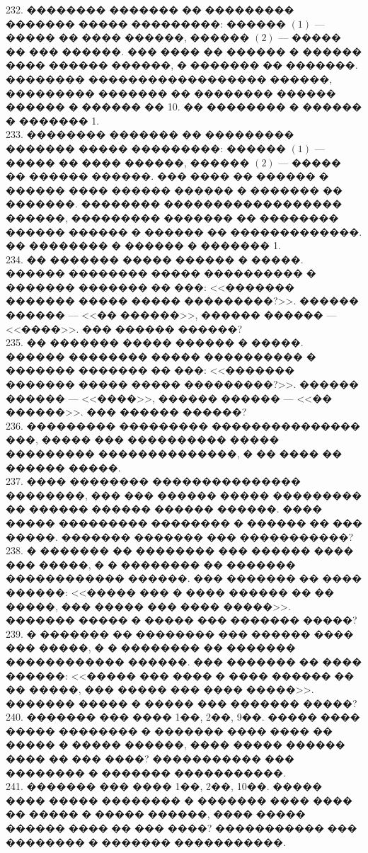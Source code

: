\documentclass[12pt]{article}
\begin{document}
232. �������� ������� �� ��������� ������� ����� ���������: ������ $(1)$ --- ����� �� ���� ������, ������ $(2)$ --- ����� �� ��� ������. ��� ���� �� ������ � ������ ���� ������ ������,  � ������� �� �������. �������� ������������������ ������, ��������� ������� �� �������� ������ ������ � ������ �� 10. �� �������� � ������ � ������� 1.\\
233. �������� ������� �� ��������� ������� ����� ���������: ������ $(1)$ --- ����� �� ���� ������, ������ $(2)$ --- ����� �� ������ ������. ��� ���� �� ������ � ������ ���� ������ ������ � ������� �� �������. �������� ������������������ ������, ��������� ������� �� �������� ������ ������ � ������ �� �������������. �� �������� � ������ � ������� 1.\\
234. �� ������� ����� ������ � �����. ������ �������� ����� ���������� � ������� ������� �� ���: <<������� ������� ����� ����� ���������?>>. ������ ������ --- <<�� ������>>,  ������ ������ --- <<����>>. ��� ������ ������?\\
235. �� ������� ����� ������ � �����. ������ �������� ����� ���������� � ������� ������� �� ���: <<������� ������� ����� ����� ���������?>>. ������ ������ --- <<����>>,  ������ ������ --- <<�� ������>>. ��� ������ ������?\\
236. ��������� ��������� ��������������� ���, ����� ��� ���������� ����� ��������� ��������������, � �� ���� �� ������ �����.\\
237. ���� �������� ��������������� ��������, ��� ��� ������ ����� ��������� �� ������ ������ ������ ������. ���� ����� ��������� �������� � ������ �� ��� �����. ������� ������� ��� �����������?\\
238. � ������� �� �������� ��� ������ ���� ��� �����, � � �������� �� ������� ������������ ������. ��� ������� �� ���� ������: <<����� ��� � ���� ������ �� �� �����, ��� ����� ��� ���� �����>>. ������� ����� � ����� ��� ������� �����?\\
239. � ������� �� �������� ��� ������ ���� ��� �����, � � �������� �� ������� ������������ ������. ��� ������� �� ���� ������: <<����� ��� ���� � ���� ������ �� �� �����, ��� ����� ��� ���� �����>>. ������� ����� � ����� ��� ������� �����?\\
240. ������� ��� ���� 1��, 2��, 9��. ����� ���� ����� �������� � ������� ���� ���� �� ����� � ����� ������, ���� ����� ������ ���� �� ��� ����? ����������� ��� �������� � ������� �����������.\\
241. ������� ��� ���� 1��, 2��, 10��. ����� ���� ����� �������� � ������� ���� ���� �� ����� � ����� ������, ���� ����� ������ ���� �� ��� ����? ����������� ��� �������� � ������� �����������.\\
\end{document}
